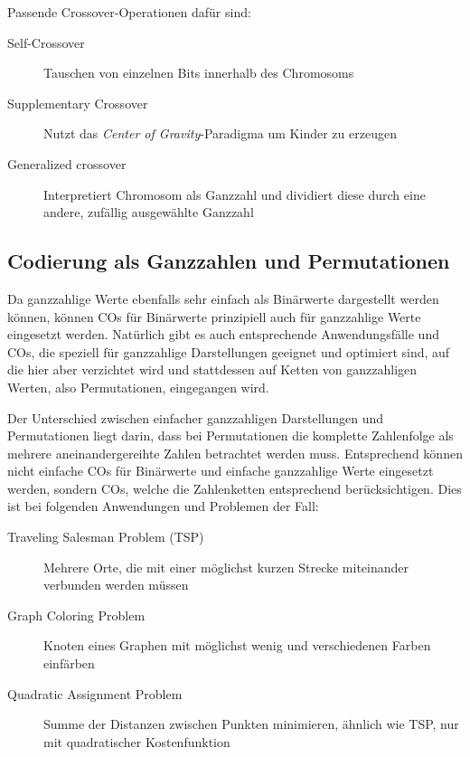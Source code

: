 	Passende Crossover-Operationen dafür sind:
	\begin{description}
		\item[Self-Crossover] Tauschen von einzelnen Bits innerhalb des Chromosoms\cite{SelfCrossover}
		\item[Supplementary Crossover] Nutzt das \textit{Center of Gravity}-Paradigma um Kin\-der zu erzeugen\cite{SupplementaryCrossover}
		\item[Generalized crossover] Interpretiert Chromosom als Ganzzahl und dividiert diese durch eine andere, zufällig ausgewählte Ganzzahl\cite{GeneralizedCrossover}
	\end{description}

\subsection{Codierung als Ganzzahlen und Permutationen}
\label{sec:IntCod}

	Da ganzzahlige Werte ebenfalls sehr einfach als Binärwerte dargestellt werden können, können COs für Binärwerte prinzipiell auch für ganzzahlige Werte eingesetzt werden. Natürlich gibt es auch entsprechende Anwendungsfälle und COs, die speziell für ganzzahlige Darstellungen geeignet und optimiert sind, auf die hier aber verzichtet wird und stattdessen auf Ketten von ganzzahligen Werten, also Permutationen, eingegangen wird.
	
	Der Unterschied zwischen einfacher ganzzahligen Darstellungen und Permutationen liegt darin, dass bei Permutationen die komplette Zahlenfolge als mehrere aneinandergereihte Zahlen betrachtet werden muss. Entsprechend kön\-nen nicht einfache COs für Binärwerte und einfache ganzzahlige Werte eingesetzt werden, sondern COs, welche die Zahlenketten entsprechend berücksichtigen. Dies ist \uA bei folgenden Anwendungen und Problemen der Fall:
	\begin{description}
		\item[Traveling Salesman Problem (TSP)] Mehrere Orte, die mit einer möglichst kurzen Strecke miteinander verbunden werden müssen\cite{GAforTSP}
		\item[Graph Coloring Problem] Knoten eines Graphen mit möglichst wenig und verschiedenen Farben einfärben\cite{OrderBasedForGCP}
		\item[Quadratic Assignment Problem] Summe der Distanzen zwischen Punkten minimieren, ähnlich wie TSP, nur mit quadratischer Kostenfunktion\cite{COforQAP}
	\end{description}
	
